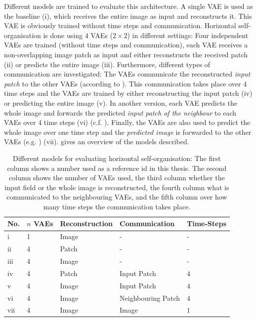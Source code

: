 Different models are trained to evaluate this architecture. A single VAE is used as the baseline (i), which receives the entire image as input and reconstructs it. This VAE is obviously trained without time steps and communication. Horizontal self-organisation is done using $4$ VAEs ($2\times 2$) in different settings: Four independent VAEs are trained (without time steps and communication), each VAE receives a non-overlapping image patch as input and either reconstructs the received patch (ii) or predicts the entire image (iii). Furthermore, different types of communication are investigated: The VAEs communicate the reconstructed \emph{input patch} to the other VAEs (according to ). This communication takes place over $4$ time steps and the VAEs are trained by either reconstructing the input patch (iv) or predicting the entire image (v). In another version, each VAE predicts the whole image and forwards the predicted \emph{input patch of the neighbour} to each VAEs over $4$ time steps  (vi) (c.f. ). Finally, the VAEs are also used to predict the whole image over one time step and the \emph{predicted image} is forwarded to the other VAEs (e.g. ) (vii).  gives an overview of the models described.


\begin{table}[h] 
    \centering
	 \begin{tabular}{l l l l l}
    	\textbf{No.} & \textbf{$n$ VAEs} & \textbf{Reconstruction} & \textbf{Communication} & \textbf{Time-Steps}\\
        \hline
		i & 1 & Image & -  & -\\
		ii & 4 & Patch & -  & -\\
		iii & 4 & Image & - & -\\
		iv & 4 & Patch & Input Patch & $4$\\ %
		v & 4 & Image & Input Patch & $4$\\  %
		vi & 4 & Image & Neighbouring Patch & $4$\\ %
		vii & 4 & Image & Image & $1$\\
    \end{tabular}
    \caption[Different Models to Evaluate Horizontal Self-Organisation]{Different models for evaluating horizontal self-organisation: The first column shows a number used as a reference id in this thesis. The second column shows the number of VAEs used, the third column whether the input field or the whole image is reconstructed, the fourth column what is communicated to the neighbouring VAEs, and the fifth column over how many time steps the communication takes place.}
\end{table}

